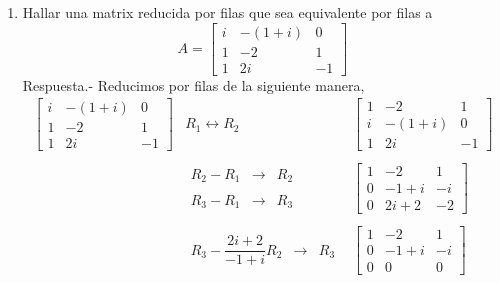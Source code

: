 \begin{enumerate}[\bfseries 1.]
    \item Hallar una matrix reducida por filas que sea equivalente por filas a 
    $$A=\left[\begin{array}{*{3}{r}}
	i & -(1+i) & 0 \\
	1 & -2 & 1 \\
	1 & 2i & -1
    \end{array}\right]$$
    \vspace{0.5cm}
	Respuesta.-\; Reducimos por filas de la siguiente manera,
	$$
	\begin{array}{*{3}{c}}
	    \left[\begin{array}{*{3}{r}}
		i & -(1+i) & 0 \\
		1 & -2 & 1 \\
		1 & 2i & -1
	    \end{array}\right]
	&
	R_1 \leftrightarrow R_2
	&
	\left[\begin{array}{*{3}{r}}
		1 & -2 & 1 \\
		i & -(1+i) & 0 \\
		1 & 2i & -1
	    \end{array}\right]\\\\
	&
	\begin{array}{rcl}
	    R_2-R_1&\to& R_2\\\\
	    R_3-R_1&\to& R_3
	\end{array}
	&
	\left[\begin{array}{*{3}{r}}
		1 & -2 & 1 \\
		0 & -1+i & -i \\
		0 & 2i+2 & -2
	    \end{array}\right] \\\\
	&
	\begin{array}{rcl}
	    R_3-\dfrac{2i+2}{-1+i}R_2&\to& R_3
	\end{array}
	&
	\left[\begin{array}{*{3}{r}}
		1 & -2 & 1 \\
		0 & -1+i & -i \\
		0 & 0 & 0
	\end{array}\right]
	\end{array}
	$$
	\vspace{.5cm}



\end{enumerate}
